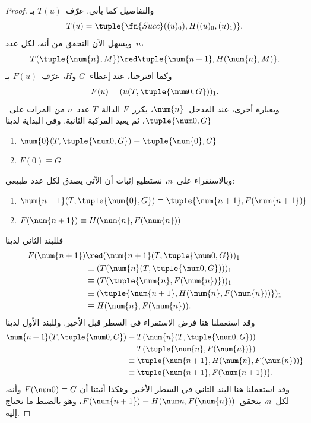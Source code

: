 \documentclass[../../../include/open-logic-section]{subfiles}
\begin{document}
\begin{proof}
والتفاصيل كما يأتي. عرّف~$T(u)$ بـ
\[
T(u) = \tuple{\fn{Succ}((u)_0), H((u)_0,(u)_1)}.
\]
ويسهل الآن التحقق من أنه، لكل عدد~$n$،
\[
T(\tuple{\num{n}, M}) \red \tuple{\num{n+1}, H(\num{n}, M)}.
\]
وكما اقترحنا، عند إعطاء~$G$ و$H$، عرّف~$F(u)$ بـ
\[
F(u) = (u(T,\tuple{\num 0, G}))_1.
\]
وبعبارة أخرى، عند المدخل~$\num{n}$، يكرر~$F$ الدالة~$T$ عدد~$n$ من
المرات على~$\tuple{\num 0, G}$، ثم يعيد المركبة الثانية. وفي البداية
لدينا
\begin{enumerate}
\item $\num{0} (T, \tuple{\num 0, G}) \equiv \tuple{\num{0}, G}$
\item $F(\num{0}) \equiv G$
\end{enumerate}
وبالاستقراء على~$n$، نستطيع إثبات أن الآتي يصدق لكل عدد طبيعي:
\begin{enumerate}
\item $\num{n+1}(T, \tuple{\num{0}, G}) \equiv \tuple{\num{n+1}, F(\num{n+1})}$
\item $F(\num{n+1}) \equiv H(\num{n}, F(\num{n}))$
\end{enumerate}
فللبند الثاني لدينا
\begin{align*}
F(\num{n+1}) & \red (\num{n+1}(T, \tuple{\num 0, G}))_1 \\
& \equiv (T(\num{n} (T, \tuple{\num 0, G})))_1 \\
& \equiv (T(\tuple{\num{n}, F(\num{n})}))_1 \\
& \equiv (\tuple{\num{n+1}, H(\num{n}, F(\num{n}))})_1 \\
& \equiv H(\num{n}, F(\num{n})).
\end{align*}
وقد استعملنا هنا فرض الاستقراء في السطر قبل الأخير. وللبند الأول لدينا
\begin{align*}
\num{n+1} (T, \tuple{\num 0, G}) &
\equiv T(\num{n} (T, \tuple{\num 0, G})) \\
& \equiv T( \tuple{\num{n}, F(\num{n})}) \\
& \equiv \tuple{\num{n+1}, H(\num{n}, F(\num{n}))} \\
& \equiv \tuple{\num{n+1}, F(\num{n+1})}.
\end{align*}
وقد استعملنا هنا البند الثاني في السطر الأخير. وهكذا أثبتنا أن
$F(\num 0) \equiv G$ وأنه، لكل~$n$، يتحقق~$F(\num {n+1}) \equiv H(\num n,
F(\num{n}))$، وهو بالضبط ما نحتاج إليه.
\end{proof}
\end{document}
